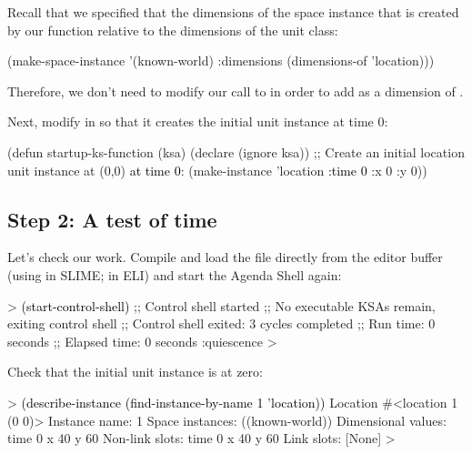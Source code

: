 \documentclass[10pt,twoside,english,pdftex]{article}
\begin{document}
Recall that we specified that the dimensions of the  space
instance that is created by our  function relative to
the dimensions of the  unit class:
%
\begin{example}\color{darkergray}%
    (make-space-instance 
        '(known-world)
        :dimensions (dimensions-of 'location)))
\end{example}
%
Therefore, we don't need to modify our call to  in
order to add  as a dimension of .

Next, modify  in  so
that it creates the initial  unit instance at time 0:
%
\begin{example}\color{darkergray}%
  (defun startup-ks-function (ksa)
    (declare (ignore ksa))
    ;; Create an initial location unit instance at (0,0) \textcolor{black}{at time 0}:
    (make-instance 'location \textcolor{black}{:time 0} :x 0 :y 0))
\end{example}

\subsection*{Step 2: A test of time}

Let's check our work.  Compile and load the
 file directly from the editor buffer (using
 in SLIME;  in ELI) and start the Agenda Shell
again:
%
\begin{example}\color{darkergray}%
  > \textcolor{black}{(start-control-shell)}
  ;; Control shell started
  ;; No executable KSAs remain, exiting control shell
  ;; Control shell exited: 3 cycles completed
  ;; Run time: 0 seconds
  ;; Elapsed time: 0 seconds
  :quiescence
  >
\end{example}

%
%
Check that the initial  unit instance is at  zero:
%
\begin{example}\color{darkergray}%
  > \textcolor{black}{(describe-instance (find-instance-by-name 1 'location))}
  Location #<location 1 (0 0)>
    Instance name: 1
    Space instances: ((known-world))
    Dimensional values:
      time 0
      x 40
      y 60
    Non-link slots:
      time 0
      x 40
      y 60
    Link slots:
      [None]
  >
\end{example}
\end{document}
